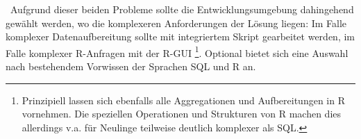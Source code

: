 ~\newline Aufgrund dieser beiden Probleme sollte die Entwicklungsumgebung dahingehend gewählt werden, wo die komplexeren Anforderungen der Lösung liegen: Im Falle komplexer Datenaufbereitung sollte mit integriertem Skript gearbeitet werden, im Falle komplexer R-Anfragen mit der R-GUI \footnote{Prinzipiell lassen sich ebenfalls alle Aggregationen und Aufbereitungen in R vornehmen. Die speziellen Operationen und Strukturen von R machen dies allerdings v.a. für Neulinge teilweise deutlich komplexer als SQL.}.  Optional bietet sich eine Auswahl nach bestehendem Vorwissen der Sprachen SQL und R an. 
